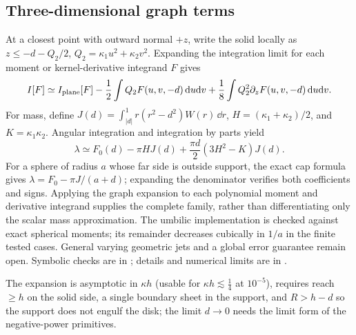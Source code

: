 \subsection{Three-dimensional graph terms}
At a closest point with outward normal $+z$, write the solid locally as
$z\le-d-Q_2/2$, $Q_2=\kappa_1u^2+\kappa_2v^2$. Expanding the integration
limit for each moment or kernel-derivative integrand $F$ gives
\[
 I[F]\simeq I_{\rm plane}[F]-\frac12\int Q_2F(u,v,-d)\,\mathrm{d} u\mathrm{d} v
       +\frac18\int Q_2^2\partial_zF(u,v,-d)\,\mathrm{d} u\mathrm{d} v.
\]
For mass, define $J(d)=\int_{|d|}^1r(r^2-d^2)W(r)\,\dd r$,
$H=(\kappa_1+\kappa_2)/2$, and $K=\kappa_1\kappa_2$. Angular integration and
integration by parts yield
\[
 \lambda\simeq F_0(d)-\pi HJ(d)+\frac{\pi d}{2}(3H^2-K)J(d).
\]
For a sphere of radius $a$ whose far side is outside support, the exact cap
formula gives $\lambda=F_0-\pi J/(a+d)$; expanding the denominator verifies
both coefficients and signs. Applying the graph expansion to each polynomial
moment and derivative integrand supplies the complete family, rather than
differentiating only the scalar mass approximation. The umbilic implementation
is checked against exact spherical moments; its remainder decreases cubically
in $1/a$ in the finite tested cases. General varying geometric jets and a
global error guarantee remain open. Symbolic checks are in
; details and numerical limits are in
. 
\begin{remark}[Validity]
The expansion is asymptotic in $\kappa h$ (usable for $\kappa h\lesssim\frac14$ at $10^{-5}$), requires reach $\ge h$ on the solid side, a single
boundary sheet in the support, and $R>h-d$ so the support does not engulf the disk; the limit $d\to0$ needs the limit form of the negative-power primitives.
\end{remark}
